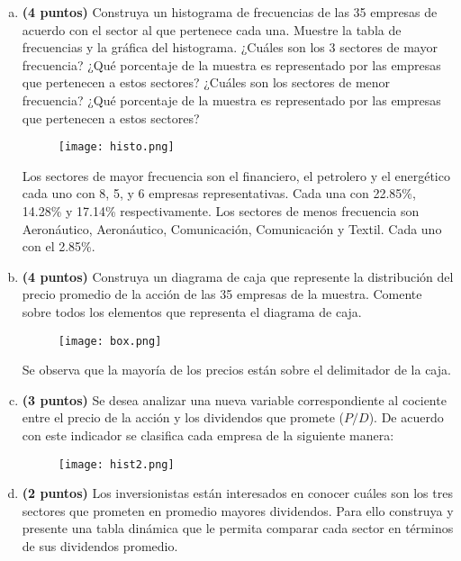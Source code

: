 \documentclass[../main.tex]{subfiles}
\begin{document}
\begin{enumerate}[(a)]

\item \textbf{(4 puntos)} Construya un histograma de frecuencias de las 35 empresas de acuerdo con el sector al que pertenece cada una. Muestre la tabla de frecuencias y la gráfica del histograma. ¿Cuáles son los 3 sectores de mayor frecuencia? ¿Qué porcentaje de la muestra es
representado por las empresas que pertenecen a estos sectores? ¿Cuáles son los sectores de menor frecuencia? ¿Qué porcentaje de la muestra es representado por las empresas que pertenecen a estos sectores?

\begin{figure}[h]
\centering
\texttt{[image: histo.png]}
\label{fig:img1}
\end{figure}

Los sectores de mayor frecuencia son el financiero, el petrolero y el energético cada uno con 8, 5, y 6 empresas representativas. Cada una con 22.85\%, 14.28\% y 17.14\% respectivamente. Los sectores de menos frecuencia son  Aeronáutico, Aeronáutico, Comunicación, Comunicación y Textil. Cada uno con el 2.85\%.

\item \textbf{(4 puntos)} Construya un diagrama de caja que represente la distribución del precio promedio de la acción de las 35 empresas de la muestra. Comente sobre todos los elementos que representa el diagrama de caja.

\begin{figure}[h]
\centering
\texttt{[image: box.png]}
\label{fig:img1}
\end{figure}

Se observa que la mayoría de los precios están sobre el delimitador de la caja.

\pagebreak

\item \textbf{(3 puntos)} Se desea analizar una nueva variable correspondiente al cociente entre el precio de la acción y los dividendos que promete ($P/D$). De acuerdo con este indicador se clasifica cada empresa de la siguiente manera:

\begin{figure}[h]
\centering
\texttt{[image: hist2.png]}
\label{fig:img1}
\end{figure}

\pagebreak

\item \textbf{(2 puntos)} Los inversionistas están interesados en conocer cuáles son los tres sectores que prometen en promedio mayores dividendos. Para ello construya y presente una tabla dinámica que le permita comparar cada sector en términos de sus dividendos promedio.


\end{enumerate}
\end{document}
